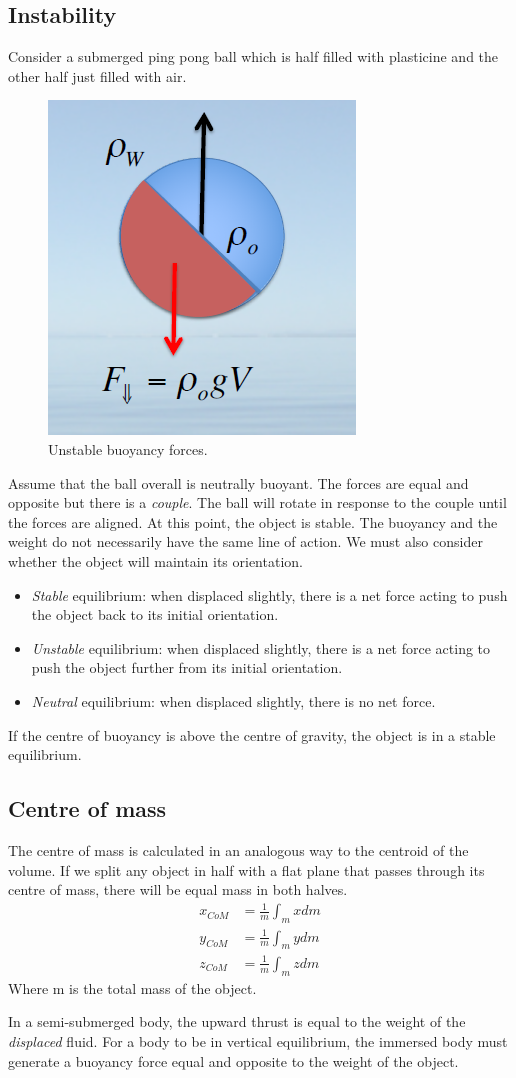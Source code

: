 \documentclass[class=report, crop=false, 12pt,a4paper]{standalone}
\numberwithin{equation}{section}
\begin{document}
\subsection{Instability}
Consider a submerged ping pong ball which is half filled with plasticine and the other half just filled with air.
\begin{figure}[h!]
  \centering
  \includegraphics[width = 0.4 \textwidth]{../img/InstabilityPingPong}
  \caption{Unstable buoyancy forces.}
\end{figure}
Assume that the ball overall is neutrally buoyant. The forces are equal and opposite but there is a \emph{couple}. The ball will rotate in response to the couple until the forces are aligned. At this point, the object is stable. The buoyancy and the weight do not necessarily have the same line of action. We must also consider whether the object will maintain its orientation. 
\begin{itemize}
  \item \emph{Stable} equilibrium: when displaced slightly, there is a net force acting to push the object back to its initial orientation.
  \item \emph{Unstable} equilibrium: when displaced slightly, there is a net force acting to push the object further from its initial orientation.
  \item \emph{Neutral} equilibrium: when displaced slightly, there is no net force. 
\end{itemize}
If the centre of buoyancy is above the centre of gravity, the object is in a stable equilibrium. 
\subsection{Centre of mass}
The centre of mass is calculated in an analogous way to the centroid of the volume. If we split any object in half with a flat plane that passes through its centre of mass, there will be equal mass in both halves.
\begin{align}
  x_{CoM} &= \frac{1}{m}\int_m x dm \\
  y_{CoM} &= \frac{1}{m}\int_m y dm \\
  z_{CoM} &= \frac{1}{m}\int_m z dm
\end{align}
Where m is the total mass of the object. 

In a semi-submerged body, the upward thrust is equal to the weight of the \emph{displaced} fluid. For a body to be in vertical equilibrium, the immersed body must generate a buoyancy force equal and opposite to the weight of the object.
\end{document}
